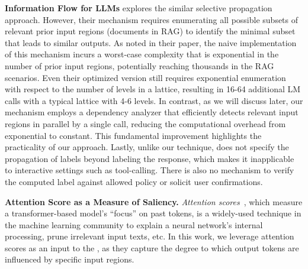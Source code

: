\textbf{Information Flow for LLMs} 
\cite{siddiqui2024permissiveinformationflowanalysislarge} explores the similar selective propagation approach. However,  their mechanism requires enumerating all possible subsets of relevant prior input regions (documents in RAG) to identify the minimal subset that leads to similar outputs. As noted in their paper, the naive implementation of this mechanism incurs a worst-case complexity that is exponential in the number of prior input regions, potentially reaching thousands in the RAG scenarios. Even their optimized version still requires exponential enumeration with respect to the number of levels in a lattice, resulting in 16-64 additional LM calls with a typical lattice with 4-6 levels. In contrast, as we will discuss later, our mechanism employs a dependency analyzer that efficiently detects relevant input regions in parallel by a single call, reducing the computational overhead from exponential to constant. This fundamental improvement highlights the practicality of our approach. Lastly, unlike our technique, \cite{siddiqui2024permissiveinformationflowanalysislarge} does not specify the propagation of labels beyond labeling the response, which makes it inapplicable to interactive settings such as tool-calling. There is also no mechanism to verify the computed label against allowed policy or solicit user confirmations. 


\textbf{Attention Score as a Measure of Saliency.}
\textit{Attention scores}~\cite{vaswani2017attention,wiegreffe2019attention}, which measure a transformer-based model's ``focus'' on past tokens, is a widely-used technique in the machine learning community to explain a neural network's internal processing\cite{jain2019attention,wang2023label}, prune irrelevant input texts\cite{zhang2023h2o}, etc.  In this work, we leverage attention scores as an input to the \dependencydetector, as they capture the degree to which output tokens are influenced by specific input regions.